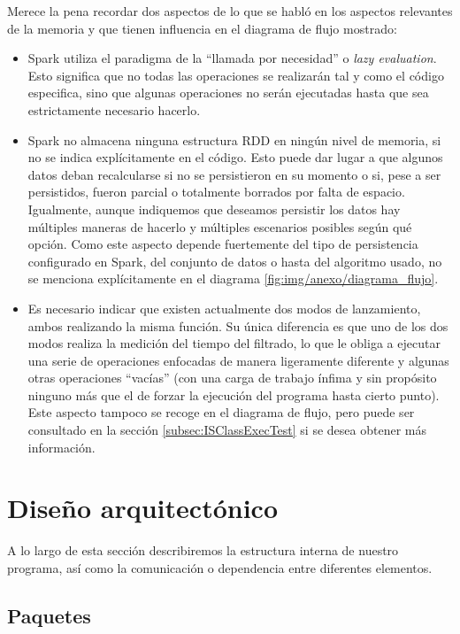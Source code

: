 
Merece la pena recordar dos aspectos de lo que se habló en los aspectos relevantes de la memoria y que tienen influencia en el diagrama de flujo mostrado:
\begin{itemize}
\item Spark utiliza el paradigma de la ``llamada por necesidad'' o \textit{lazy evaluation}. Esto significa que no todas las operaciones se realizarán tal y como el código especifica, sino que algunas operaciones no serán ejecutadas hasta que sea estrictamente necesario hacerlo.
\item Spark no almacena ninguna estructura RDD en ningún nivel de memoria, si no se indica explícitamente en el código. Esto puede dar lugar a que algunos datos deban recalcularse si no se persistieron en su momento o si, pese a ser persistidos, fueron parcial o totalmente borrados por falta de espacio. Igualmente, aunque indiquemos que deseamos persistir los datos hay múltiples maneras de hacerlo y múltiples escenarios posibles según qué opción. Como este aspecto depende fuertemente del tipo de persistencia configurado en Spark, del conjunto de datos o hasta del algoritmo usado, no se menciona explícitamente en el diagrama \ref{fig:img/anexo/diagrama_flujo}.
\item Es necesario indicar que existen actualmente dos modos de lanzamiento, ambos realizando la misma función. Su única diferencia es que uno de los dos modos realiza la medición del tiempo del filtrado, lo que le obliga a ejecutar una serie de operaciones enfocadas de manera ligeramente diferente y algunas otras operaciones ``vacías'' (con una carga de trabajo ínfima y sin propósito ninguno más que el de forzar la ejecución del programa hasta cierto punto). Este aspecto tampoco se recoge en el diagrama de flujo, pero puede ser consultado en la sección \ref{subsec:ISClassExecTest} si se desea obtener más información.
\end{itemize}

\section{Diseño arquitectónico}
A lo largo de esta sección describiremos la estructura interna de nuestro programa, así como la comunicación o dependencia entre diferentes elementos.

\subsection{Paquetes}

